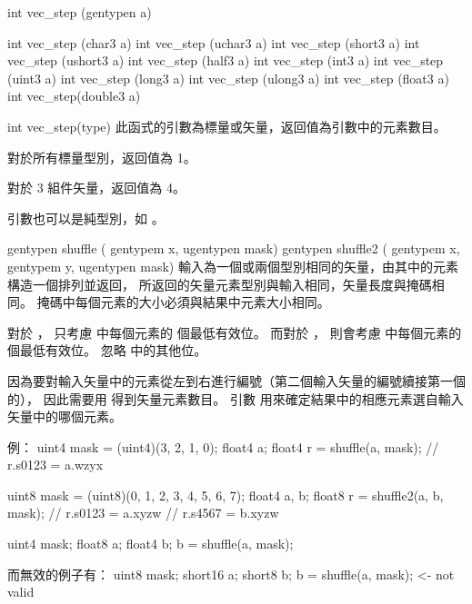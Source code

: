 int vec_step (gentypen a) 

int vec_step (char3 a)
int vec_step (uchar3 a)
int vec_step (short3 a)
int vec_step (ushort3 a)
int vec_step (half3 a)
int vec_step (int3 a)
int vec_step (uint3 a)
int vec_step (long3 a)
int vec_step (ulong3 a)
int vec_step (float3 a)
int vec_step(double3 a)

int vec_step(type)
\stopbuffer
{}
此函式的引數為標量或矢量，返回值為引數中的元素數目。

對於所有標量型別，返回值為 1。

對於 3 組件矢量，返回值為 4。

引數也可以是純型別，如 。
\stopbuffer

gentypen shuffle (
	gentypem x,
	ugentypen mask)
gentypen shuffle2 (
	gentypem x,
	gentypem y,
	ugentypen mask)
\stopbuffer
{}
輸入為一個或兩個型別相同的矢量，由其中的元素構造一個排列並返回，
所返回的矢量元素型別與輸入相同，矢量長度與掩碼相同。
掩碼中每個元素的大小必須與結果中元素大小相同。

對於 ，
只考慮  中每個元素的  個最低有效位。
而對於 ，
則會考慮  中每個元素的  個最低有效位。
忽略  中的其他位。

因為要對輸入矢量中的元素從左到右進行編號（第二個輸入矢量的編號續接第一個的），
因此需要用  得到矢量元素數目。
引數  用來確定結果中的相應元素選自輸入矢量中的哪個元素。

例：
\startcintbl
uint4 mask = (uint4)(3, 2, 1, 0);
float4 a;
float4 r = shuffle(a, mask);
// r.s0123 = a.wzyx

uint8 mask = (uint8)(0, 1, 2, 3, 4, 5, 6, 7);
float4 a, b;
float8 r = shuffle2(a, b, mask);
// r.s0123 = a.xyzw
// r.s4567 = b.xyzw

uint4 mask;
float8 a;
float4 b;
b = shuffle(a, mask);
\stopcintbl

而無效的例子有：
\startcintbl
uint8 mask;
short16 a;
short8 b;
b = shuffle(a, mask); <- not valid
\stopcintbl
\stopbuffer

\startCLFD
{}
\stopCLFD
